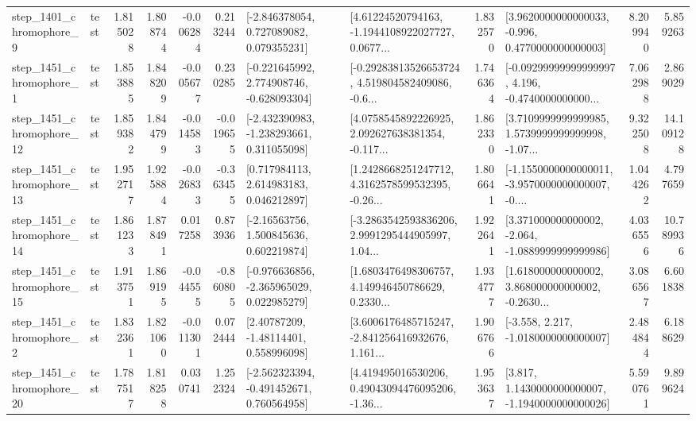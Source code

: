 \begin{tabular}{llrrrrllrlrr}
  step\_1401\_chromophore\_9 &      test &      1.815028 &    1.808744 &     -0.006284 &  0.213244 &    [-2.846378054, 0.727089082, 0.079355231] &  [4.61224520794163, -1.1944108922027727, 0.0677... &       1.832570 &   [3.9620000000000033, -0.996, 0.4770000000000003] &            8.209940 &          5.859263 \\
  step\_1451\_chromophore\_1 &      test &      1.853885 &    1.848209 &     -0.005677 &  0.230285 &   [-0.221645992, 2.774908746, -0.628093304] &  [-0.29283813526653724, 4.519804582409086, -0.6... &       1.746364 &  [-0.09299999999999997, 4.196, -0.4740000000000... &            7.062988 &          2.869029 \\
 step\_1451\_chromophore\_12 &      test &      1.859382 &    1.844799 &     -0.014583 & -0.019655 &   [-2.432390983, -1.238293661, 0.311055098] &  [4.0758545892226925, 2.092627638381354, -0.117... &       1.862330 &  [3.7109999999999985, 1.5739999999999998, -1.07... &            9.322508 &         14.109128 \\
 step\_1451\_chromophore\_13 &      test &      1.952717 &    1.925884 &     -0.026833 & -0.363455 &     [0.717984113, 2.614983183, 0.046212897] &  [1.2428668251247712, 4.3162578599532395, -0.26... &       1.806641 &  [-1.1550000000000011, -3.9570000000000007, -0.... &            1.044262 &          4.797659 \\
 step\_1451\_chromophore\_14 &      test &      1.861233 &    1.878491 &      0.017258 &  0.873936 &     [-2.16563756, 1.500845636, 0.602219874] &  [-3.2863542593836206, 2.9991295444905997, 1.04... &       1.922641 &   [3.371000000000002, -2.064, -1.0889999999999986] &            4.036556 &         10.789936 \\
 step\_1451\_chromophore\_15 &      test &      1.913751 &    1.869195 &     -0.044555 & -0.860805 &   [-0.976636856, -2.365965029, 0.022985279] &  [1.6803476498306757, 4.149946450786629, 0.2330... &       1.934777 &  [1.618000000000002, 3.868000000000002, -0.2630... &            3.086567 &          6.601838 \\
  step\_1451\_chromophore\_2 &      test &      1.832361 &    1.821060 &     -0.011301 &  0.072444 &      [2.40787209, -1.48114401, 0.558996098] &  [3.6006176485715247, -2.841256416932676, 1.161... &       1.906766 &               [-3.558, 2.217, -1.0180000000000007] &            2.484844 &          6.188629 \\
 step\_1451\_chromophore\_20 &      test &      1.787517 &    1.818258 &      0.030741 &  1.252324 &   [-2.562323394, -0.491452671, 0.760564958] &  [4.419495016530206, 0.49043094476095206, -1.36... &       1.953637 &   [3.817, 1.1430000000000007, -1.1940000000000026] &            5.590761 &          9.899624 \\

\end{tabular}
